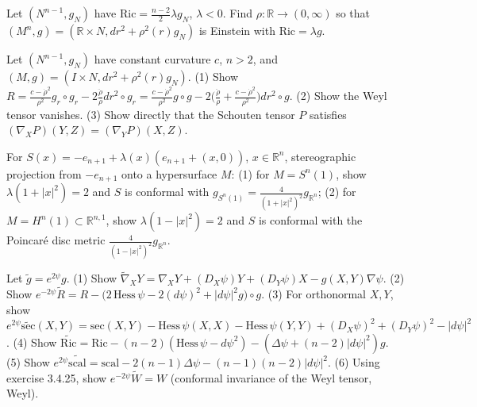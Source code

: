 \begin{remark}
  \label{rem:pet-ch4-ex-11}
  Let $(N^{n-1},g_N)$ have $\mathrm{Ric}=\tfrac{n-2}2\lambda g_N$, $\lambda<0$.
  Find $\rho:\mathbb{R}\to(0,\infty)$ so that $(M^n,g)=(\mathbb{R}\times N,dr^2+\rho^2(r)g_N)$
  is Einstein with $\mathrm{Ric}=\lambda g$.
\end{remark}

\begin{remark}
  \label{rem:pet-ch4-ex-12}
  Let $(N^{n-1},g_N)$ have constant curvature $c$, $n>2$, and
  $(M,g)=(I\times N,dr^2+\rho^2(r)g_N)$. (1) Show
  $R=\tfrac{c-\dot\rho^2}{\rho^2}g_r\circ g_r-2\tfrac{\ddot\rho}\rho dr^2\circ g_r
  =\tfrac{c-\dot\rho^2}{\rho^2}g\circ g-2\big(\tfrac{\ddot\rho}\rho+\tfrac{c-\dot\rho^2}{\rho^2}\big)dr^2\circ g$.
  (2) Show the Weyl tensor vanishes. (3) Show directly that the Schouten
  tensor $P$ satisfies $(\nabla_XP)(Y,Z)=(\nabla_YP)(X,Z)$.
\end{remark}

\begin{remark}
  \label{rem:pet-ch4-ex-13}
  For $S(x)=-e_{n+1}+\lambda(x)(e_{n+1}+(x,0))$, $x\in\mathbb{R}^n$, stereographic
  projection from $-e_{n+1}$ onto a hypersurface $M$: (1) for $M=S^n(1)$, show
  $\lambda(1+|x|^2)=2$ and $S$ is conformal with
  $g_{S^n(1)}=\tfrac4{(1+|x|^2)^2}g_{\mathbb{R}^n}$; (2) for $M=H^n(1)\subset\mathbb{R}^{n,1}$,
  show $\lambda(1-|x|^2)=2$ and $S$ is conformal with the Poincaré disc metric
  $\tfrac4{(1-|x|^2)^2}g_{\mathbb{R}^n}$.
\end{remark}

\begin{remark}
  \label{rem:pet-ch4-ex-14}
  Let $\tilde g=e^{2\psi}g$. (1) Show
  $\tilde\nabla_XY=\nabla_XY+(D_X\psi)Y+(D_Y\psi)X-g(X,Y)\nabla\psi$. (2) Show
  $e^{-2\psi}\tilde R=R-\big(2\,\mathrm{Hess}\,\psi-2(d\psi)^2+|d\psi|^2g\big)\circ g$.
  (3) For orthonormal $X,Y$, show
  $e^{2\psi}\widetilde{\mathrm{sec}}(X,Y)=\mathrm{sec}(X,Y)-\mathrm{Hess}\,\psi(X,X)-\mathrm{Hess}\,\psi(Y,Y)+(D_X\psi)^2+(D_Y\psi)^2-|d\psi|^2$.
  (4) Show
  $\widetilde{\mathrm{Ric}}=\mathrm{Ric}-(n-2)(\mathrm{Hess}\,\psi-d\psi^2)-(\Delta\psi+(n-2)|d\psi|^2)g$.
  (5) Show $e^{2\psi}\widetilde{\mathrm{scal}}=\mathrm{scal}-2(n-1)\Delta\psi-(n-1)(n-2)|d\psi|^2$.
  (6) Using exercise 3.4.25, show $e^{-2\psi}\tilde W=W$ (conformal invariance
  of the Weyl tensor, Weyl).
\end{remark}

